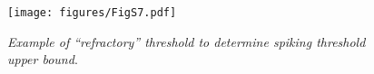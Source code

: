 \begin{figure}[H]
    \centering
    \texttt{[image: figures/FigS7.pdf]}
    \caption{
    \textit{Example of ``refractory'' threshold to determine spiking threshold upper bound}.
    }
    \label{supp:demo-refrac-thres}
\end{figure}
